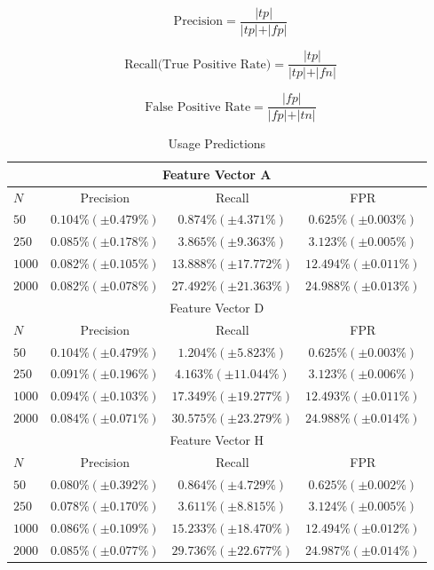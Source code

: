 \documentclass[cic,tc,english]{iiufrgs}
\begin{document}
\begin{equation}
\text{Precision} = \frac{\vert tp \vert}{\vert tp \vert + \vert fp \vert}
\end{equation}

\begin{equation} \label{recall}
\text{Recall(True Positive Rate)} = \frac{\vert tp \vert}{\vert tp \vert + \vert fn \vert}
\end{equation}

\begin{equation}
\text{False Positive Rate} = \frac{\vert fp \vert}{\vert fp \vert + \vert tn \vert}
\end{equation}

\begin{table}
\center
\caption{Usage Predictions}
\begin{tabular}{| l | c | c | c |}
 \hline 
 \multicolumn{4}{|c|}{Feature Vector A} \\ \hline
\rowcolor{lightgray} $N$ & Precision & Recall & FPR  \\ \hline 

$50$ & $0.104\% (\pm 0.479\%)$& $0.874\% (\pm 4.371\%)$&$ 0.625\% (\pm 0.003\%)$ \\ \hline
$250$ & $0.085\% (\pm 0.178\%)$& $3.865\% (\pm 9.363\%)$&$ 3.123\% (\pm 0.005\%)$ \\ \hline
$1000$ & $0.082\% (\pm 0.105\%)$& $13.888\% (\pm 17.772\%)$&$ 12.494\% (\pm 0.011\%)$ \\ \hline
$2000$ & $0.082\% (\pm 0.078\%)$& $27.492\% (\pm 21.363\%)$&$ 24.988\% (\pm 0.013\%)$ \\ \hline

\multicolumn{4}{|c|}{Feature Vector D} \\ \hline
\rowcolor{lightgray} $N$ & Precision & Recall & FPR  \\ \hline 
$50$ & $0.104\% (\pm 0.479\%)$& $1.204\% (\pm 5.823\%)$&$ 0.625\% (\pm 0.003\%)$ \\ \hline
$250$ & $0.091\% (\pm 0.196\%)$& $4.163\% (\pm 11.044\%)$&$ 3.123\% (\pm 0.006\%)$ \\ \hline
$1000$ & $0.094\% (\pm 0.103\%)$& $17.349\% (\pm 19.277\%)$&$ 12.493\% (\pm 0.011\%)$ \\ \hline
$2000$ & $0.084\% (\pm 0.071\%)$& $30.575\% (\pm 23.279\%)$&$ 24.988\% (\pm 0.014\%)$ \\ \hline

\multicolumn{4}{|c|}{Feature Vector H} \\ \hline
\rowcolor{lightgray} $N$ & Precision & Recall & FPR  \\ \hline 
$50$ & $0.080\% (\pm 0.392\%)$& $0.864\% (\pm 4.729\%)$&$ 0.625\% (\pm 0.002\%)$ \\ \hline
$250$ & $0.078\% (\pm 0.170\%)$& $3.611\% (\pm 8.815\%)$&$ 3.124\% (\pm 0.005\%)$ \\ \hline
$1000$ & $0.086\% (\pm 0.109\%)$& $15.233\% (\pm 18.470\%)$&$ 12.494\% (\pm 0.012\%)$ \\ \hline
$2000$ & $0.085\% (\pm 0.077\%)$& $29.736\% (\pm 22.677\%)$&$ 24.987\% (\pm 0.014\%)$ \\ \hline


\end{tabular}
\end{table}
\end{document}
